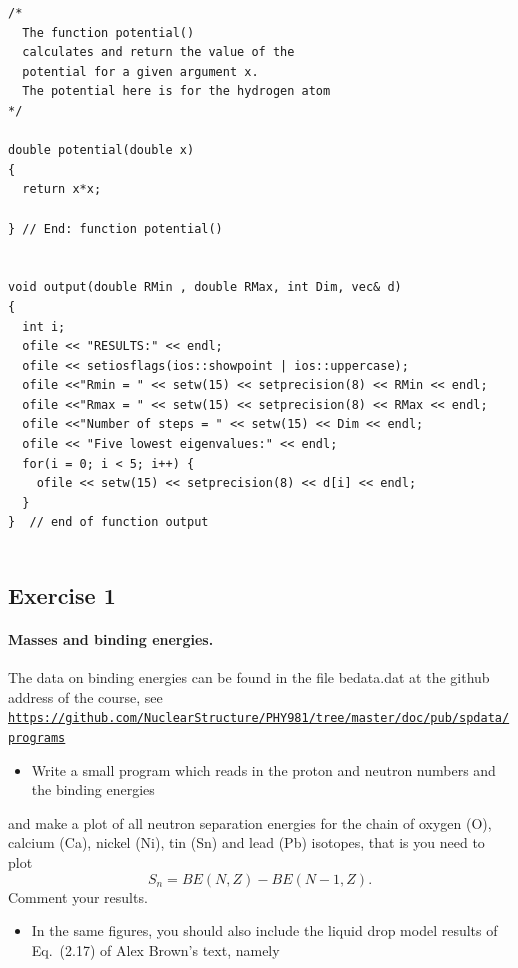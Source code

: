 \documentclass[%
twoside,                 %
final,                   %
10pt]{article}
\begin{document}
\begin{verbatim}
/*
  The function potential()
  calculates and return the value of the 
  potential for a given argument x.
  The potential here is for the hydrogen atom
*/        

double potential(double x)
{
  return x*x;

} // End: function potential()  


void output(double RMin , double RMax, int Dim, vec& d)
{
  int i;
  ofile << "RESULTS:" << endl;
  ofile << setiosflags(ios::showpoint | ios::uppercase);
  ofile <<"Rmin = " << setw(15) << setprecision(8) << RMin << endl;  
  ofile <<"Rmax = " << setw(15) << setprecision(8) << RMax << endl;  
  ofile <<"Number of steps = " << setw(15) << Dim << endl;  
  ofile << "Five lowest eigenvalues:" << endl;
  for(i = 0; i < 5; i++) {
    ofile << setw(15) << setprecision(8) << d[i] << endl;
  }
}  // end of function output         


\end{verbatim}





\subsection*{Exercise 1}

\paragraph{Masses and binding energies.}
The data on binding energies can be found in the file bedata.dat at the github address of the course, see
\href{{https://github.com/NuclearStructure/PHY981/tree/master/doc/pub/spdata/programs}}{\nolinkurl{https://github.com/NuclearStructure/PHY981/tree/master/doc/pub/spdata/programs}}

\begin{itemize}
  \item Write a small program which reads in the proton and neutron numbers and the binding energies 
\end{itemize}

\noindent
and make a plot of all neutron separation energies for the chain of oxygen (O), calcium (Ca), nickel (Ni), tin (Sn) and lead (Pb) isotopes, that is you need to plot
\[
S_n= BE(N,Z)-BE(N-1,Z).
\]
Comment your results. 
\begin{itemize}
 \item In the same figures, you should also include the liquid drop model results of Eq.~(2.17) of Alex Brown's text, namely
\end{itemize}
\end{document}
